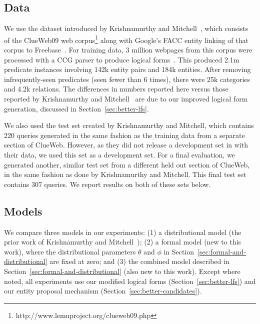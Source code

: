 \documentclass[11pt]{article}
\newcommand{\secref}[1]{Section~\ref{sec:#1}}
\begin{document}
\subsection{Data}

We use the dataset introduced by Krishnamurthy and
Mitchell~,
which consists of the ClueWeb09 web
corpus\footnote{http://www.lemuproject.org/clueweb09.php} along with
Google's FACC entity linking of that corpus to
Freebase~\cite{gabrilovich-2013-clueweb-entity-linking}.  For training
data, 3 million webpages from this corpus were processed with a CCG
parser to produce logical forms~\cite{krishnamurthy-2014-joint-ccg}.
This produced 2.1m predicate instances involving 142k entity pairs and
184k entities.  After removing infrequently-seen predicates (seen
fewer than 6 times), there were 25k categories and 4.2k relations.
The differences in numbers reported here versus those reported by
Krishnamurthy and
Mitchell~ are
due to our improved logical form generation, discussed in
\secref{better-lfs}.

We also used the test set created by Krishnamurthy and Mitchell, which
contains 220 queries generated in the same fashion as the training
data from a separate section of ClueWeb.  However, as they did not
release a development set in with their data, we used this set as a
development set.  For a final evaluation, we generated another,
similar test set from a different held out section of ClueWeb, in the
same fashion as done by Krishnamurthy and Mitchell.  This final test
set contains 307 queries.  We report results on both of these sets
below.

\subsection{Models}

We compare three models in our experiments: (1) a distributional model
(the prior work of Krishnamurthy and
Mitchell~); (2)
a formal model (new to this work), where the distributional parameters
$\theta$ and $\phi$ in \secref{formal-and-distributional} are fixed at
zero; and (3) the combined model described in
\secref{formal-and-distributional} (also new to this work).  Except
where noted, all experiments use our modified logical forms
(\secref{better-lfs}) and our entity proposal mechanism
(\secref{better-candidates}).
\end{document}

